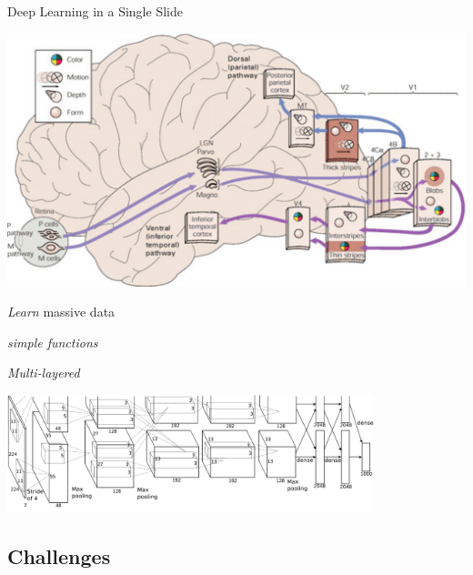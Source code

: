 \documentclass{beamer}
\begin{document}
\begin{frame}{Deep Learning in a Single Slide}
\begin{minipage}{0.32\textwidth}
         \includegraphics[width=0.9\columnwidth]{visual_pathway.pdf}
         \\
     \end{minipage}

     \begin{minipage}{0.32\textwidth}
         \centering
         \small
         \textit{Learn} massive data
     \end{minipage}
     \hfill
     \begin{minipage}{0.32\textwidth}
         \centering
         \small
         \textit{simple functions}
     \end{minipage}
     \hfill
     \begin{minipage}{0.32\textwidth}
         \centering
         \small
         \textit{Multi-layered} 
     \end{minipage}

     \vspace{3mm}
    \centering
    \includegraphics[width=0.8\textwidth]{alex_imagenet}
    \\

    \vfill


\end{frame}

\subsection{Challenges}
\end{document}
